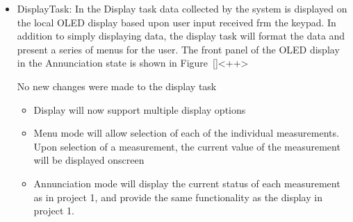 \documentclass[12pt]{article} %
\begin{document}
\begin{itemize}
  \item DisplayTask:
		In the Display task data collected by the system is displayed on the local
		OLED display based upon user input received frm the keypad. In addition to simply displaying data, the display task will format the data and present a series of menus for the user. The front panel of the OLED display in the Annunciation state is shown in Figure~\ref{}<++>

		No new changes were made to the display task
    \begin{itemize}
      \item Display will now support multiple display options
      \item Menu mode will allow selection of each of the individual
	measurements. Upon selection of a measurement, the current value of the
	measurement will be displayed onscreen
      \item Annunciation mode will display the current status of each
	measurement as in project 1, and provide the same functionality as the
	display in project 1.
    \end{itemize}


\end{itemize}
\end{document}
